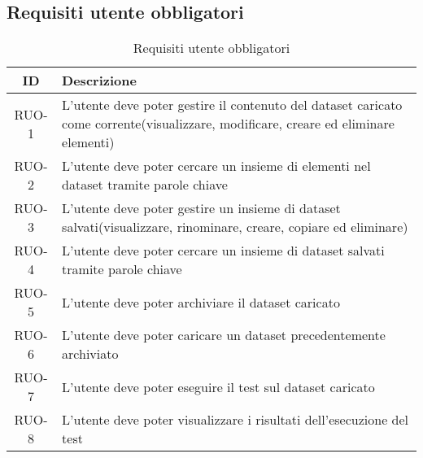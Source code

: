 \subsection{Requisiti utente obbligatori}
\begin{table}[H]
    \begin{tabularx}{\textwidth}{|c|X|}
        \hline
        \textbf{ID} & \textbf{Descrizione} \\
        \hline
        \label{ru:RUO-1} RUO-1 & L'utente deve poter gestire il contenuto del dataset caricato come corrente(visualizzare, modificare, creare ed eliminare elementi)\\
        \label{ru:RUO-2} RUO-2 & L'utente deve poter cercare un insieme di elementi nel dataset tramite parole chiave \\
        \label{ru:RUO-3} RUO-3 & L'utente deve poter gestire un insieme di dataset salvati(visualizzare, rinominare, creare, copiare ed eliminare)\\
        \label{ru:RUO-4} RUO-4 & L'utente deve poter cercare un insieme di dataset salvati tramite parole chiave \\
        \label{ru:RUO-5} RUO-5 & L'utente deve poter archiviare il dataset caricato \\
        \label{ru:RUO-6} RUO-6 & L'utente deve poter caricare un dataset precedentemente archiviato \\
        \label{ru:RUO-7} RUO-7 & L'utente deve poter eseguire il test sul dataset caricato \\
        \label{ru:RUO-8} RUO-8 & L'utente deve poter visualizzare i risultati dell'esecuzione del test \\
        \hline
    \end{tabularx}
    \vspace{10px}
    \caption{Requisiti utente obbligatori}
\end{table}

